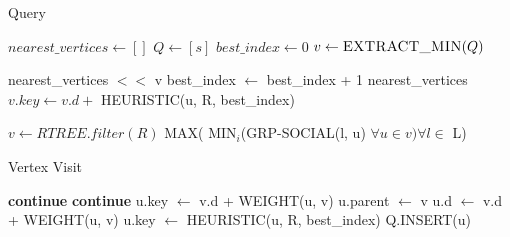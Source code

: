 \begin{algorithm}[t]
\caption{{\rrp} Query}
\begin{scriptsize}
\label{alg3}
\begin{algorithmic}[1]
	\State $nearest\_vertices \gets []$
	\State $Q \gets [s]$
	\State $best\_index \gets 0$
	  \label{alg:theqstart}
		\State $v \gets \Call{EXTRACT\_MIN}{Q}$
		
			\State nearest\_vertices $<<$ v 
			\State best\_index $\gets$ best\_index + 1
				\State \Return nearest\_vertices
			\EndIf
			 
				\State $v.key \gets v.d +$ HEURISTIC(u, R, best\_index)
			\EndFor
		\EndIf
		
			\State {}
		\EndIf
	\EndWhile	\label{alg:theqend}
\EndFunction

	\State $v \gets RTREE.filter(R)$   	
	\State \Return MAX( MIN$_i$(GRP-SOCIAL(l, u) $\forall u \in v) \forall l \in$ L)
\EndFunction

\end{algorithmic}

\end{scriptsize}
\end{algorithm}


\begin{algorithm}[t]
\caption{Vertex Visit}
\begin{scriptsize}
\label{alg4}
\begin{algorithmic}[1]
		 \label{alg:liesin}
			\State \textbf{continue}
		\EndIf
					\State \textbf{continue}
				\Else
					\State u.key $\gets$ v.d + WEIGHT(u, v)
				\EndIf
			\Else
				\State u.parent $\gets$ v
				\State u.d $\gets$ v.d + WEIGHT(u, v)
				\State u.key $\gets$ HEURISTIC(u, R, best\_index)
				\State Q.INSERT(u)
			\EndIf
		\EndIf
	\EndFor
\EndFunction
\end{algorithmic}

\end{scriptsize}
\end{algorithm}

